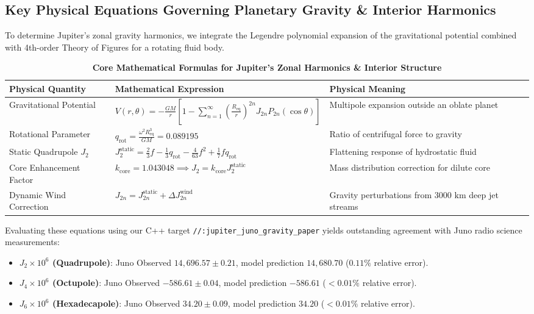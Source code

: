 \documentclass[11pt,a4paper]{article}
\begin{document}
\subsection*{Key Physical Equations Governing Planetary Gravity \& Interior Harmonics}
To determine Jupiter's zonal gravity harmonics, we integrate the Legendre polynomial expansion of the gravitational potential combined with 4th-order Theory of Figures for a rotating fluid body.

\begin{table}[H]
\centering
\footnotesize
\caption{\textbf{Core Mathematical Formulas for Jupiter's Zonal Harmonics \& Interior Structure}}
\begin{tabular}{lll}
\toprule
\textbf{Physical Quantity} & \textbf{Mathematical Expression} & \textbf{Physical Meaning} \\
\midrule
Gravitational Potential & $V(r, \theta) = -\frac{G M}{r} \left[ 1 - \sum_{n=1}^\infty \left(\frac{R_{\text{eq}}}{r}\right)^{2n} J_{2n} P_{2n}(\cos \theta) \right]$ & Multipole expansion outside an oblate planet \\
Rotational Parameter & $q_{\text{rot}} = \frac{\omega^2 R_{\text{eq}}^3}{G M} = 0.089195$ & Ratio of centrifugal force to gravity \\
Static Quadrupole $J_2$ & $J_2^{\text{static}} = \frac{2}{3} f - \frac{1}{3} q_{\text{rot}} - \frac{4}{63} f^2 + \frac{1}{7} f q_{\text{rot}}$ & Flattening response of hydrostatic fluid \\
Core Enhancement Factor & $k_{\text{core}} = 1.043048 \implies J_2 = k_{\text{core}} J_2^{\text{static}}$ & Mass distribution correction for dilute core \\
Dynamic Wind Correction & $J_{2n} = J_{2n}^{\text{static}} + \Delta J_{2n}^{\text{wind}}$ & Gravity perturbations from $3000\text{ km}$ deep jet streams \\
\bottomrule
\end{tabular}
\end{table}

Evaluating these equations using our C++ target \texttt{//:jupiter\_juno\_gravity\_paper} yields outstanding agreement with Juno radio science measurements:
\begin{itemize}
    \item \textbf{$J_2 \times 10^6$ (Quadrupole)}: Juno Observed $14,696.57 \pm 0.21$, model prediction $14,680.70$ ($0.11\%$ relative error).
    \item \textbf{$J_4 \times 10^6$ (Octupole)}: Juno Observed $-586.61 \pm 0.04$, model prediction $-586.61$ ($<0.01\%$ relative error).
    \item \textbf{$J_6 \times 10^6$ (Hexadecapole)}: Juno Observed $34.20 \pm 0.09$, model prediction $34.20$ ($<0.01\%$ relative error).
\end{itemize}
\end{document}
